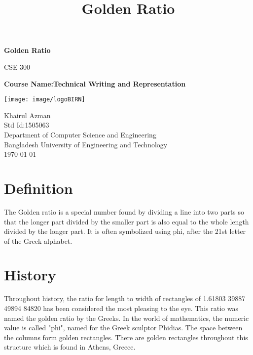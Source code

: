 \documentclass{article}
\title{Golden Ratio}
\begin{document}
\begin{titlepage}

    \begin{center}
        \vspace*{1cm}
        
        \Huge
        \textbf{Golden Ratio}
        
        \vspace{0.5cm}
        \LARGE
        CSE 300
        
        
        \textbf{Course Name:Technical Writing and Representation}
        
     
        
       
        
        \vspace{2 cm}
         
        \texttt{[image: image/logoBIRN]}
        \vfill
        \Large
         
        Khairul Azman\\
        Std Id:1505063\\
          Department of Computer Science and Engineering\\
          Bangladesh University of Engineering and Technology\\
      \today
        
    \end{center}
\end{titlepage}

\tableofcontents
\newpage
\section{Definition}
\label{sec:definition}
 The Golden ratio is a special number found by dividing a line into two parts so that the longer part divided by the smaller part is also equal to the whole length divided by the longer part. It is often symbolized using phi, after the 21st letter of the Greek alphabet.
 \section{History}
Throughout history, the ratio for length to width of rectangles of 1.61803 39887 49894 84820 has been considered the most pleasing to the eye. This ratio was named the golden ratio by the Greeks. In the world of mathematics, the numeric value is called "phi", named for the Greek sculptor Phidias. The space between the columns form golden rectangles. There are golden rectangles throughout this structure which is found in Athens, Greece.
\end{document}
